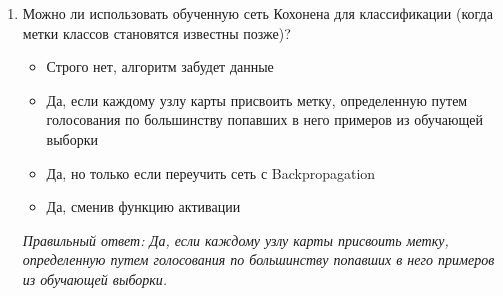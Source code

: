 \begin{enumerate}[label=\textbf{\arabic*.}, leftmargin=0pt, itemsep=1.2em]
\item Можно ли использовать обученную сеть Кохонена для классификации (когда метки классов становятся известны позже)?
\begin{itemize}[label=$\square$, leftmargin=1.5cm, itemsep=0.2em, topsep=0.3em]
\item Строго нет, алгоритм забудет данные
\item Да, если каждому узлу карты присвоить метку, определенную путем голосования по большинству попавших в него примеров из обучающей выборки
\item Да, но только если переучить сеть с Backpropagation
\item Да, сменив функцию активации
\end{itemize}
{\small\textit{Правильный ответ: Да, если каждому узлу карты присвоить метку, определенную путем голосования по большинству попавших в него примеров из обучающей выборки.}}

\end{enumerate}
